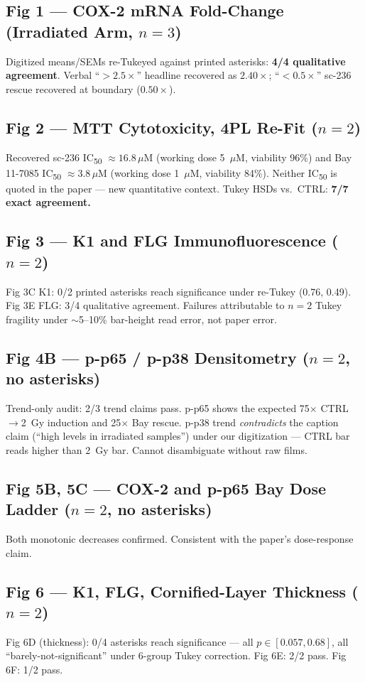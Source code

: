 \documentclass[11pt]{article}
\begin{document}
\subsection{Fig 1 --- COX-2 mRNA Fold-Change (Irradiated Arm, $n=3$)}
Digitized means/SEMs re-Tukeyed against printed asterisks: \textbf{4/4 qualitative agreement}. Verbal ``$>2.5\times$'' headline recovered as $2.40\times$; ``$<0.5\times$'' sc-236 rescue recovered at boundary ($0.50\times$).

\subsection{Fig 2 --- MTT Cytotoxicity, 4PL Re-Fit ($n=2$)}
Recovered sc-236 IC\textsubscript{50} $\approx 16.8\,\mu\text{M}$ (working dose 5~$\mu\text{M}$, viability 96\%) and Bay 11-7085 IC\textsubscript{50} $\approx 3.8\,\mu\text{M}$ (working dose 1~$\mu\text{M}$, viability 84\%). Neither IC\textsubscript{50} is quoted in the paper --- new quantitative context. Tukey HSDs vs.\ CTRL: \textbf{7/7 exact agreement.}

\subsection{Fig 3 --- K1 and FLG Immunofluorescence ($n=2$)}
Fig 3C K1: 0/2 printed asterisks reach significance under re-Tukey (0.76, 0.49). Fig 3E FLG: 3/4 qualitative agreement. Failures attributable to $n=2$ Tukey fragility under $\sim$5--10\% bar-height read error, not paper error.

\subsection{Fig 4B --- p-p65 / p-p38 Densitometry ($n=2$, no asterisks)}
Trend-only audit: 2/3 trend claims pass. p-p65 shows the expected 75$\times$ CTRL$\to$2~Gy induction and 25$\times$ Bay rescue. p-p38 trend \emph{contradicts} the caption claim (``high levels in irradiated samples'') under our digitization --- CTRL bar reads higher than 2~Gy bar. Cannot disambiguate without raw films.

\subsection{Fig 5B, 5C --- COX-2 and p-p65 Bay Dose Ladder ($n=2$, no asterisks)}
Both monotonic decreases confirmed. Consistent with the paper's dose-response claim.

\subsection{Fig 6 --- K1, FLG, Cornified-Layer Thickness ($n=2$)}
Fig 6D (thickness): 0/4 asterisks reach significance --- all $p \in [0.057, 0.68]$, all ``barely-not-significant'' under 6-group Tukey correction. Fig 6E: 2/2 pass. Fig 6F: 1/2 pass.
\end{document}
